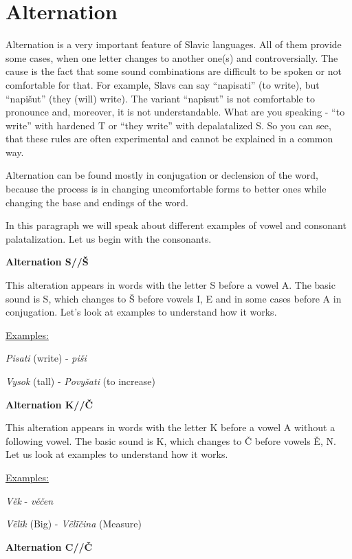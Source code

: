 \section{Alternation}

Alternation is a very important feature of Slavic languages. All of them provide some cases, when one letter changes to another one(s) and controversially. The cause is the fact that some sound combinations are difficult to be spoken or not comfortable for that. For example, Slavs can say “napisati” (to write), but “napišut” (they (will) write). The variant “napisut” is not comfortable to pronounce and, moreover, it is not understandable. What are you speaking - “to write” with hardened T or “they write” with depalatalized S. So you can see, that these rules are often experimental and cannot be explained in a common way.

Alternation can be found mostly in conjugation or declension of the word, because the process is in changing uncomfortable forms to better ones while changing the base and endings of the word. 

In this paragraph we will speak about different examples of vowel and consonant palatalization. Let us begin with the consonants.

\textbf{Alternation S//Š}

This alteration appears in words with the letter S before a vowel A. The basic sound is S, which changes to Š before vowels I, E and in some cases before A in conjugation. Let’s look at examples to understand how it works.

\underline{Examples:}

\textit{Pisati} (write) \textipa{[’pisat1]} - \textit{piši} \textipa{[pi’\:s1]}

\textit{Vysok} (tall) \textipa{[v1'sok]} - \textit{Povyšati} \textipa{[po'v1SatI]} (to increase)

\textbf{Alternation K//Č}

This alteration appears in words with the letter K before a vowel A without a following vowel. The basic sound is K, which changes to Č before vowels Ě, N. Let us look at examples to understand how it works.

\underline{Examples:}

\textit{Věk} \textipa{[vIk]} - \textit{věčen} \textipa{['vI\t{tS}en]}

\textit{Vëlïk} \textipa{['velik]} (Big) - \textit{Vëlïčina}  (Measure)

\textbf{Alternation C//Č}

